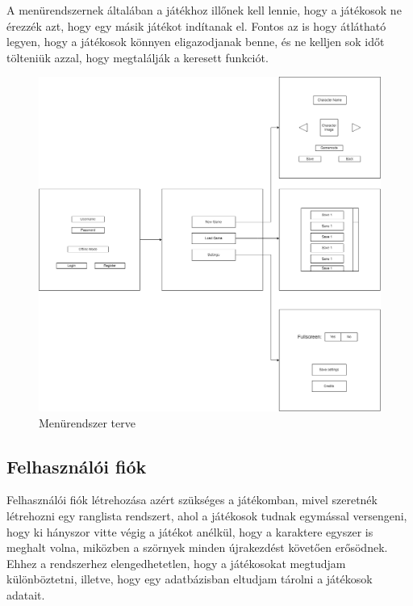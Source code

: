 A menürendszernek általában a játékhoz illőnek kell lennie, hogy a játékosok ne érezzék azt, hogy egy másik játékot indítanak el. Fontos az is hogy átlátható legyen, hogy a játékosok könnyen eligazodjanak benne, és ne kelljen sok időt tölteniük azzal, hogy megtalálják a keresett funkciót.

\begin{figure}[H]
    \centering
    \includegraphics[width=14.0truecm]{images/MS_menu.drawio.png}
    \caption{Menürendszer terve}
    \label{fig:Menürendszer terve}
\end{figure}

\subsection{Felhasználói fiók}
Felhasználói fiók létrehozása azért szükséges a játékomban, mivel szeretnék létrehozni egy ranglista rendszert, ahol a játékosok tudnak egymással versengeni, hogy ki hányszor vitte végig a játékot anélkül, hogy a karaktere egyszer is meghalt volna, miközben a szörnyek minden újrakezdést követően erősödnek. Ehhez a rendszerhez elengedhetetlen, hogy a játékosokat megtudjam különböztetni, illetve, hogy egy adatbázisban eltudjam tárolni a játékosok adatait.

